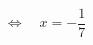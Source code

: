 \documentclass[preview]{standalone}
\begin{document}
\begin{align*}
\Leftrightarrow\quad x = -\dfrac{1}{7}
\end{align*}
\end{document}
